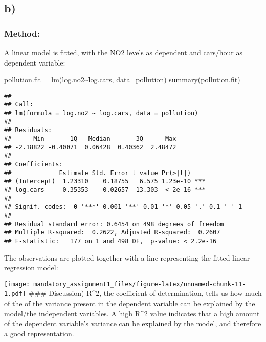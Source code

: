\documentclass[
]{article}
\newenvironment{Shaded}{\begin{snugshade}}{\end{snugshade}}
\newcommand{\AttributeTok}[1]{\textcolor[rgb]{0.77,0.63,0.00}{#1}}
\newcommand{\FunctionTok}[1]{\textcolor[rgb]{0.00,0.00,0.00}{#1}}
\newcommand{\NormalTok}[1]{#1}
\newcommand{\OtherTok}[1]{\textcolor[rgb]{0.56,0.35,0.01}{#1}}
\newcommand{\SpecialCharTok}[1]{\textcolor[rgb]{0.00,0.00,0.00}{#1}}
\begin{document}
\hypertarget{b}{%
\subsection{b)}\label{b}}

\hypertarget{method-1}{%
\subsubsection{Method:}\label{method-1}}

A linear model is fitted, with the NO2 levels as dependent and cars/hour
as dependent variable:

\begin{Shaded}
\begin{Highlighting}[]
\NormalTok{pollution.fit }\OtherTok{=} \FunctionTok{lm}\NormalTok{(log.no2}\SpecialCharTok{\textasciitilde{}}\NormalTok{log.cars, }\AttributeTok{data=}\NormalTok{pollution)}
\FunctionTok{summary}\NormalTok{(pollution.fit)}
\end{Highlighting}
\end{Shaded}

\begin{verbatim}
## 
## Call:
## lm(formula = log.no2 ~ log.cars, data = pollution)
## 
## Residuals:
##      Min       1Q   Median       3Q      Max 
## -2.18822 -0.40071  0.06428  0.40362  2.48472 
## 
## Coefficients:
##             Estimate Std. Error t value Pr(>|t|)    
## (Intercept)  1.23310    0.18755   6.575 1.23e-10 ***
## log.cars     0.35353    0.02657  13.303  < 2e-16 ***
## ---
## Signif. codes:  0 '***' 0.001 '**' 0.01 '*' 0.05 '.' 0.1 ' ' 1
## 
## Residual standard error: 0.6454 on 498 degrees of freedom
## Multiple R-squared:  0.2622, Adjusted R-squared:  0.2607 
## F-statistic:   177 on 1 and 498 DF,  p-value: < 2.2e-16
\end{verbatim}

The observations are plotted together with a line representing the
fitted linear regression model:

\begin{Shaded}
\end{Shaded}

\texttt{[image: mandatory\_assignment1\_files/figure-latex/unnamed-chunk-11-1.pdf]}
\#\#\# Discussion) R\^{}2, the coefficient of determination, tells us
how much of the of the variance present in the dependent variable can be
explained by the model/the independent variables. A high R\^{}2 value
indicates that a high amount of the dependent variable's variance can be
explained by the model, and therefore a good representation.
\end{document}
